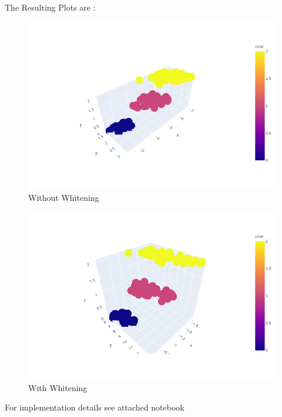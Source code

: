 The Resulting Plots are :

\begin{figure}[h]
    \includegraphics[width=1\textwidth]{wout_W.png}
    \caption{Without Whitening}
 \end{figure}
\newpage
\begin{figure}[h]
    \includegraphics[width=1\textwidth]{with_w.png}
    \caption{With Whitening}
\end{figure}
For implementation details see attached notebook
